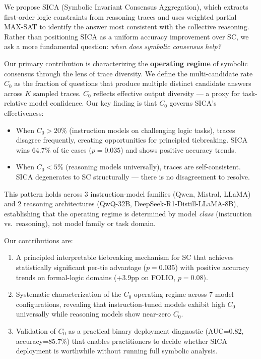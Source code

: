 \documentclass[11pt]{article}
\begin{document}
We propose SICA (Symbolic Invariant Consensus Aggregation), which extracts first-order logic constraints from reasoning traces and uses weighted partial MAX-SAT to identify the answer most consistent with the collective reasoning. Rather than positioning SICA as a uniform accuracy improvement over SC, we ask a more fundamental question: \emph{when does symbolic consensus help?}

Our primary contribution is characterizing the \textbf{operating regime} of symbolic consensus through the lens of trace diversity. We define the multi-candidate rate $C_0$ as the fraction of questions that produce multiple distinct candidate answers across $K$ sampled traces. $C_0$ reflects effective output diversity --- a proxy for task-relative model confidence. Our key finding is that $C_0$ governs SICA's effectiveness:

\begin{itemize}
    \item When $C_0 > 20\%$ (instruction models on challenging logic tasks), traces disagree frequently, creating opportunities for principled tiebreaking. SICA wins 64.7\% of tie cases ($p=0.035$) and shows positive accuracy trends.
    \item When $C_0 < 5\%$ (reasoning models universally), traces are self-consistent. SICA degenerates to SC structurally --- there is no disagreement to resolve.
\end{itemize}

This pattern holds across 3 instruction-model families (Qwen, Mistral, LLaMA) and 2 reasoning architectures (QwQ-32B, DeepSeek-R1-Distill-LLaMA-8B), establishing that the operating regime is determined by model \emph{class} (instruction vs.\ reasoning), not model family or task domain.

Our contributions are:
\begin{enumerate}
    \item A principled interpretable tiebreaking mechanism for SC that achieves statistically significant per-tie advantage ($p=0.035$) with positive accuracy trends on formal-logic domains (+3.9pp on FOLIO, $p=0.08$).
    \item Systematic characterization of the $C_0$ operating regime across 7 model configurations, revealing that instruction-tuned models exhibit high $C_0$ universally while reasoning models show near-zero $C_0$.
    \item Validation of $C_0$ as a practical binary deployment diagnostic (AUC=0.82, accuracy=85.7\%) that enables practitioners to decide whether SICA deployment is worthwhile without running full symbolic analysis.
\end{enumerate}
\end{document}
